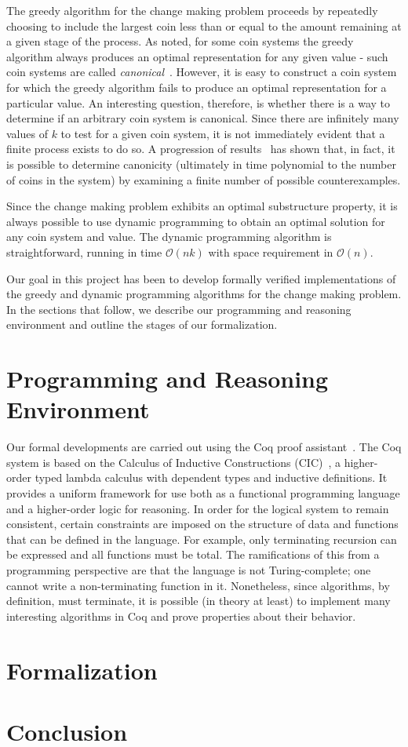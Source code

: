 \documentclass{acm_proc_article-sp}
\begin{document}
The greedy algorithm for the change making problem proceeds by repeatedly choosing to include the largest coin less than or equal to the amount remaining at a given stage of the process. As noted, for some coin systems the greedy algorithm always produces an optimal representation for any given value - such coin systems are called \emph{canonical}~\cite{?}. However, it is easy to construct a coin system for which the greedy algorithm fails to produce an optimal representation for a particular value. An interesting question, therefore, is whether there is a way to determine if an arbitrary coin system is canonical. Since there are infinitely many values of $k$ to test for a given coin system, it is not immediately evident that a finite process exists to do so. A progression of results~\cite{?,?,?} has shown that, in fact, it is possible to determine canonicity (ultimately in time polynomial to the number of coins in the system) by examining a finite number of possible counterexamples. 

Since the change making problem exhibits an optimal substructure property, it is always possible to use dynamic programming to obtain an optimal solution for any coin system and value. The dynamic programming algorithm is straightforward, running in time $\mathcal{O}(nk)$ with space requirement in $\mathcal{O}(n)$. 

Our goal in this project has been to develop formally verified implementations of the greedy and dynamic programming algorithms for the change making problem. In the sections that follow, we describe our programming and reasoning environment and outline the stages of our formalization. 


\section{Programming and Reasoning Environment}
Our formal developments are  carried out using the Coq proof assistant~\cite{coq09}. The Coq system is based on 
the Calculus of Inductive Constructions (CIC)~\cite{paulin93}, a higher-order typed lambda calculus with dependent types and inductive definitions. It provides a uniform framework for use  both as a functional programming language and a higher-order logic for reasoning. In order for the logical system to remain consistent, certain constraints are imposed on the structure of data  and functions that can be defined in the language. For example, only terminating recursion can be expressed and all functions must be total. The ramifications of this from a programming perspective are that the language is not Turing-complete; one cannot write a non-terminating function in it. Nonetheless, since algorithms, by definition, must terminate, it is possible (in theory at least) to implement many interesting algorithms in Coq and prove properties about their behavior. 


\section{Formalization}



\section{Conclusion}




\end{document}
